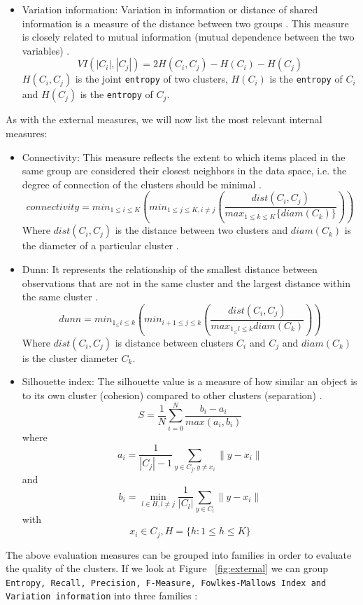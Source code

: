\begin{itemize}
    \item Variation information: Variation in information or distance of shared information is a measure of the distance between two groups \citep{b43}. This measure is closely related to mutual information (mutual dependence between the two variables) \citep{b63}.
    \begin{equation}
       VI(|C_{i}|,|C_{j}|) = 2H(C_{i},C_{j}) - H(C_{i}) - H(C_{j})
    \end{equation}
    $H(C_{i},C_{j})$ is the joint \texttt{entropy} of two clusters, $H(C_{i})$ is the \texttt{entropy} of $C_{i}$ and $H(C_{j})$ is the \texttt{entropy} of $C_{j}$. 
\end{itemize}
As with the external measures, we will now list the most relevant internal measures:
\begin{itemize}
    \item Connectivity: This measure reflects the extent to which items placed in the same group are considered their closest neighbors in the data space, i.e. the degree of connection of the clusters should be minimal \citep{b39}.
    \begin{equation}
        connectivity = min_{ 1\leq i \leq K} \left( min_{1\leq j \leq K, i\not= j} \left( \frac{dist(C_i,C_j)}{max_{1\leq k \leq K} \lbrace diam(C_k) \rbrace }  \right) \right)
    \end{equation}
    Where $dist(C_i,C_j)$ is the distance between two clusters and $diam(C_k)$ is the diameter of a particular cluster \citep{b39}.
    \item Dunn: It represents the relationship of the smallest distance between observations that are not in the same cluster and the largest distance within the same cluster \citep{b44}.
    \begin{equation}
    dunn =  min_{1_\leq i\leq k} \left( min_{i+1\leq j \leq k}  \left( \frac{dist(C_i,C_j)}{max_{1_\leq l \leq k} diam(C_{k})} \right) \right)
    \end{equation}
    Where $dist(C_{i},C_{j})$ is distance between clusters $C_{i}$ and $C_{j}$ and $diam(C_{k})$ is the cluster diameter $C_{k}$.
    \item Silhouette index: The silhouette value is a measure of how similar an object is to its own cluster (cohesion) compared to other clusters (separation) \citep{b45}.
    \begin{equation}
        S = \frac{1}{N}\sum_{i=0}^{N}\frac{b_{i} - a_{i}}{max(a_{i},b_{i})}
    \end{equation}
    where $$a_{i}=\frac{1}{|C_{j}| - 1} \sum_{y\in C_{j},y\neq x_{i}}^{}\|y-x_{i}\|$$ and
    $$ b_{i} = \min\limits_{l \in H, l\neq j}^{} \frac{1}{|C_{l}|} \sum_{y \in C_{l}}^{} \| y - x_{i} \| $$ with
    $$ x_{i} \in C_{j}, H = \{h: 1 \leq h \leq K\}$$
\end{itemize}
The above evaluation measures can be grouped into families in order to evaluate the quality of the clusters. If we look at Figure ~\ref{fig:external} we can group \texttt{Entropy, Recall, Precision, F-Measure, Fowlkes-Mallows Index and Variation information} into three families \citep{b54}:

